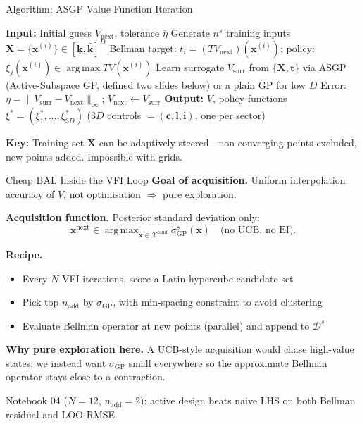 \documentclass[aspectratio=169,11pt]{beamer}
\newcommand{\emphc}[1]{\textcolor{harvardcrimson}{#1}}
\newcommand{\x}{\bm{x}}
\newcommand{\X}{\bm{X}}
\DeclareMathOperator*{\argmax}{arg\,max}
\begin{document}
\begin{frame}[fragile]{Algorithm: ASGP Value Function Iteration}
\tiny
\begin{algorithmic}[1]
\STATE \textbf{Input:} Initial guess $V_{\text{next}}$, tolerance $\bar{\eta}$
\WHILE{$\eta > \bar{\eta}$}
    \STATE Generate $n^s$ training inputs $\X = \{\x^{(i)}\} \in [\underline{\bm{k}}, \bar{\bm{k}}]^D$
    \FOR{$\x^{(i)} \in \X$}
        \STATE Bellman target: $t_i = (TV_{\text{next}})(\x^{(i)})$; \quad policy: $\xi_j(\x^{(i)}) \in \argmax TV(\x^{(i)})$
    \ENDFOR
    \STATE Learn surrogate $V_{\text{surr}}$ from $\{\X, \bm{t}\}$ via ASGP (Active-Subspace GP, defined two slides below) or a plain GP for low $D$
    \STATE Error: $\eta = \|V_{\text{surr}} - V_{\text{next}}\|_\infty$; \quad $V_{\text{next}} \leftarrow V_{\text{surr}}$
\ENDWHILE
\STATE \textbf{Output:} $V$, policy functions $\xi^* = (\xi_1^*, \ldots, \xi_{3D}^*)$ \quad ($3D$ controls $=(\bm c, \bm l, \bm i)$, one per sector)
\end{algorithmic}

\vspace{0.3em}
{\scriptsize \textbf{Key:} Training set $\X$ can be \emphc{adaptively steered}---non-converging points excluded, new points added. Impossible with grids.}
\end{frame}

\begin{frame}{Cheap BAL Inside the VFI Loop}
\textbf{Goal of acquisition.} Uniform interpolation accuracy of $V$, not optimisation $\Rightarrow$ pure exploration.

\medskip
\textbf{Acquisition function.} Posterior standard deviation only:
\[
\x^{\text{next}} \in \argmax_{\x \in \mathcal{X}^{\text{cand}}} \sigma_{\text{GP}}^s(\x)
\quad \text{(no UCB, no EI).}
\]

\medskip
\textbf{Recipe.}
\begin{itemize}\itemsep0pt
  \item Every $N$ VFI iterations, score a Latin-hypercube candidate set
  \item Pick top $n_{\text{add}}$ by $\sigma_{\text{GP}}$, with min-spacing constraint to avoid clustering
  \item Evaluate Bellman operator at new points (parallel) and append to $\mathcal{D}^s$
\end{itemize}

\medskip
\textbf{Why pure exploration here.} A UCB-style acquisition would chase high-value states; we instead want $\sigma_{\text{GP}}$ small \emphc{everywhere} so the approximate Bellman operator stays close to a contraction.

\medskip
{\scriptsize Notebook 04 ($N=12$, $n_{\text{add}}=2$): active design beats naive LHS on both Bellman residual and LOO-RMSE.}
\end{frame}
\end{document}
